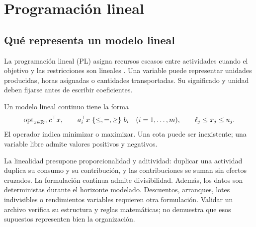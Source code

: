 \chapter{Programación lineal}
\label{chap:pl}

\section{Qué representa un modelo lineal}
La programación lineal (PL) asigna recursos escasos entre actividades cuando
el objetivo y las restricciones son lineales
\cite{dantzig1963linear,bertsimas1997introduction}. Una variable puede representar
unidades producidas, horas asignadas o cantidades transportadas. Su significado
y unidad deben fijarse antes de escribir coeficientes.

\begin{definicion}
Un modelo lineal continuo tiene la forma
\[
 \operatorname{opt}_{x\in\mathbb{R}^n} c^\top x,\qquad
 a_i^\top x\ \{\leq,=,\geq\}\ b_i\quad(i=1,\ldots,m),\qquad
 \ell_j\leq x_j\leq u_j.
\]
El operador indica minimizar o maximizar. Una cota puede ser inexistente;
una variable libre admite valores positivos y negativos.
\end{definicion}

La linealidad presupone proporcionalidad y aditividad: duplicar una actividad
duplica su consumo y su contribución, y las contribuciones se suman sin efectos
cruzados. La formulación continua admite divisibilidad. Además, los datos son
deterministas durante el horizonte modelado. Descuentos, arranques, lotes
indivisibles o rendimientos variables requieren otra formulación. Validar un
archivo verifica su estructura y reglas matemáticas; no demuestra que esos
supuestos representen bien la organización.

